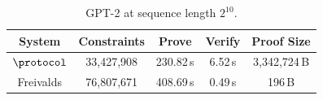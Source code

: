 \begin{table}[H]
\centering
\setlength{\tabcolsep}{3pt}
\begin{tabular*}{\columnwidth}{@{\extracolsep{\fill}}ccccc@{}}
\toprule
\textbf{System} & \textbf{Constraints} & \textbf{Prove} & \textbf{Verify} & \textbf{Proof Size} \\
\midrule
\(\protocol\) & 33{,}427{,}908 & 230.82\,s & 6.52\,s & 3{,}342{,}724\,B \\
Freivalds & 76{,}807{,}671 & 408.69\,s & 0.49\,s & 196\,B \\
\bottomrule
\end{tabular*}
\vspace{6pt}
\caption{GPT-2 at sequence length \(2^{10}\).}
\label{tab:lamp-gpt2}
\end{table}
